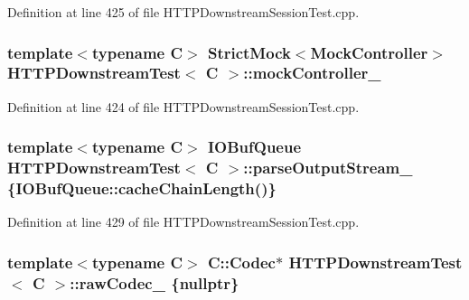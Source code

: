 Definition at line 425 of file H\+T\+T\+P\+Downstream\+Session\+Test.\+cpp.

\subsubsection[{mock\+Controller\+\_\+}]{\setlength{\rightskip}{0pt plus 5cm}template$<$typename C$>$ Strict\+Mock$<${\bf Mock\+Controller}$>$ {\bf H\+T\+T\+P\+Downstream\+Test}$<$ C $>$\+::mock\+Controller\+\_\+\hspace{0.3cm}{\ttfamily [protected]}}\label{classHTTPDownstreamTest_aebc16f384387328455eaf6979cee35f9}


Definition at line 424 of file H\+T\+T\+P\+Downstream\+Session\+Test.\+cpp.

\subsubsection[{parse\+Output\+Stream\+\_\+}]{\setlength{\rightskip}{0pt plus 5cm}template$<$typename C$>$ I\+O\+Buf\+Queue {\bf H\+T\+T\+P\+Downstream\+Test}$<$ C $>$\+::parse\+Output\+Stream\+\_\+ \{I\+O\+Buf\+Queue\+::cache\+Chain\+Length()\}\hspace{0.3cm}{\ttfamily [protected]}}\label{classHTTPDownstreamTest_a0d929e4489f4e8374d7d543d972bc42e}


Definition at line 429 of file H\+T\+T\+P\+Downstream\+Session\+Test.\+cpp.

\subsubsection[{raw\+Codec\+\_\+}]{\setlength{\rightskip}{0pt plus 5cm}template$<$typename C$>$ C\+::\+Codec$\ast$ {\bf H\+T\+T\+P\+Downstream\+Test}$<$ C $>$\+::raw\+Codec\+\_\+ \{{\bf nullptr}\}\hspace{0.3cm}{\ttfamily [protected]}}\label{classHTTPDownstreamTest_a385606fbd6451c9cedf3b74675d46dd3}


